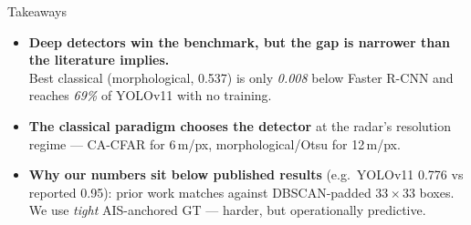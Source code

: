\documentclass[aspectratio=169,10pt]{beamer}
\newcommand{\hl}[1]{\textcolor{garnet}{\textbf{#1}}}
\begin{document}
\begin{frame}{Takeaways}
  \begin{itemize}\setlength\itemsep{0.55em}
    \item \hl{Deep detectors win the benchmark, but the gap is narrower than the literature implies.}\\
          Best classical (morphological, 0.537) is only \emph{0.008} below Faster R-CNN and reaches \emph{69\%} of YOLOv11 with no training.
    \item \hl{The classical paradigm chooses the detector} at the radar's resolution regime --- CA-CFAR for 6\,m/px, morphological/Otsu for 12\,m/px.
    \item \hl{Why our numbers sit below published results} (e.g.\ YOLOv11 0.776 vs reported 0.95): prior work matches against DBSCAN-padded $33\times33$ boxes.  We use \emph{tight} AIS-anchored GT --- harder, but operationally predictive.
  \end{itemize}
\end{frame}
\end{document}
